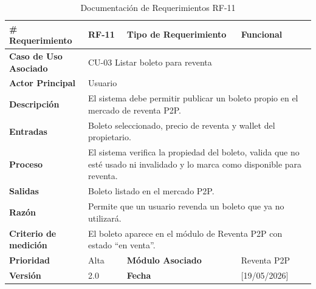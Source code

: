 \documentclass[12pt,letterpaper]{article}
\begin{document}
\begin{table}[H]
\centering
\scriptsize
\renewcommand{\arraystretch}{1.05}
\setlength{\tabcolsep}{3pt}

\newlength{\anchoceldaRFonce}
\setlength{\anchoceldaRFonce}{\dimexpr\textwidth-2.7cm-8\tabcolsep-5\arrayrulewidth\relax}

\begin{tabularx}{\textwidth}{|p{2.7cm}|X|p{2.8cm}|X|}
\hline
\textbf{\# Requerimiento} & RF-11 & \textbf{Tipo de Requerimiento} & Funcional \\ \hline

\textbf{Caso de Uso Asociado} & 
\multicolumn{3}{p{\anchoceldaRFonce}|}{CU-03 Listar boleto para reventa} \\ \hline

\textbf{Actor Principal} & 
\multicolumn{3}{p{\anchoceldaRFonce}|}{Usuario} \\ \hline

\textbf{Descripción} & 
\multicolumn{3}{p{\anchoceldaRFonce}|}{El sistema debe permitir publicar un boleto propio en el mercado de reventa P2P.} \\ \hline

\textbf{Entradas} & 
\multicolumn{3}{p{\anchoceldaRFonce}|}{Boleto seleccionado, precio de reventa y wallet del propietario.} \\ \hline

\textbf{Proceso} & 
\multicolumn{3}{p{\anchoceldaRFonce}|}{El sistema verifica la propiedad del boleto, valida que no esté usado ni invalidado y lo marca como disponible para reventa.} \\ \hline

\textbf{Salidas} & 
\multicolumn{3}{p{\anchoceldaRFonce}|}{Boleto listado en el mercado P2P.} \\ \hline

\textbf{Razón} & 
\multicolumn{3}{p{\anchoceldaRFonce}|}{Permite que un usuario revenda un boleto que ya no utilizará.} \\ \hline

\textbf{Criterio de medición} & 
\multicolumn{3}{p{\anchoceldaRFonce}|}{El boleto aparece en el módulo de Reventa P2P con estado ``en venta''.} \\ \hline

\textbf{Prioridad} & Alta & \textbf{Módulo Asociado} & Reventa P2P \\ \hline

\textbf{Versión} & 2.0 & \textbf{Fecha} & [19/05/2026] \\ \hline

\end{tabularx}

\caption{Documentación de Requerimientos RF-11}
\label{tab:documentacion_requerimientos_rf11}
\normalsize
\end{table}
\end{document}
